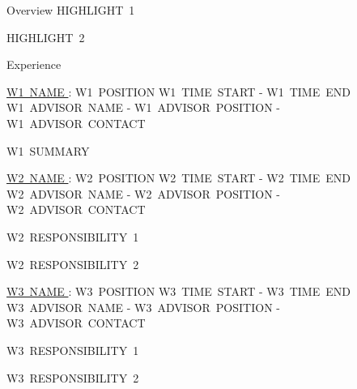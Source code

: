 \documentclass{resume} %
\begin{document}
  

  \begin{rSection}{Overview}
    HIGHLIGHT~1

    HIGHLIGHT~2
  \end{rSection}

  \begin{rSection}{Experience}

    \begin{rSubsection}{\underline{W1~NAME }: W1~POSITION }{ W1~TIME~START - W1~TIME~END }{ W1~ADVISOR~NAME - W1~ADVISOR~POSITION - W1~ADVISOR~CONTACT }

      \item W1~SUMMARY

    \end{rSubsection}

    \begin{rSubsection}{\underline{W2~NAME }: W2~POSITION }{ W2~TIME~START - W2~TIME~END }{ W2~ADVISOR~NAME - W2~ADVISOR~POSITION - W2~ADVISOR~CONTACT }

      \item W2~RESPONSIBILITY~1

      \item W2~RESPONSIBILITY~2
      

    \end{rSubsection}

    \begin{rSubsection}{\underline{W3~NAME }: W3~POSITION }{ W3~TIME~START - W3~TIME~END }{ W3~ADVISOR~NAME - W3~ADVISOR~POSITION - W3~ADVISOR~CONTACT }

      \item W3~RESPONSIBILITY~1

      \item W3~RESPONSIBILITY~2


    \end{rSubsection}

  \end{rSection}
\end{document}
